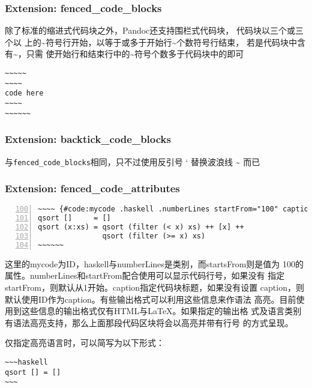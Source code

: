 \documentclass[fancyhdr,bookmark]{ctexbook}
\begin{document}
\subsubsection{Extension:
fenced\_code\_blocks}\label{extension-fencedux5fcodeux5fblocks}

除了标准的缩进式代码块之外，Pandoc还支持围栏式代码块，
代码块以三个或三个以
上的\textasciitilde{}符号行开始，以等于或多于开始行\textasciitilde{}个数符号行结束，
若是代码块中含有\textasciitilde{}，只需
使开始行和结束行中的\textasciitilde{}符号个数多于代码块中的即可

\begin{lstlisting}
~~~~~
~~~~
code here
~~~~
~~~~~~
\end{lstlisting}

\subsubsection{Extension:
backtick\_code\_blocks}\label{extension-backtickux5fcodeux5fblocks}

与\lstinline!fenced_code_blocks!相同，只不过使用反引号 ` 替换波浪线
\textasciitilde{} 而已

\subsubsection{Extension:
fenced\_code\_attributes}\label{extension-fencedux5fcodeux5fattributes}

\begin{lstlisting}[numbers=left, firstnumber=100, caption=围栏式代码块, label=code:fencedcode, float=htbp]
~~~~ {#code:mycode .haskell .numberLines startFrom="100" caption="围栏式代码块"}
qsort []     = []
qsort (x:xs) = qsort (filter (< x) xs) ++ [x] ++
               qsort (filter (>= x) xs)
~~~~~~
\end{lstlisting}

这里的mycode为ID，haskell与numberLines是类别，而startsFrom则是值为
100的属性。numberLines和startFrom配合使用可以显示代码行号，如果没有
指定startFrom，则默认从1开始。caption指定代码块标题，如果没有设置
caption，则默认使用ID作为caption。有些输出格式可以利用这些信息来作语法
高亮。目前使用到这些信息的输出格式仅有HTML与LaTeX。如果指定的输出格
式及语言类别有语法高亮支持，那么上面那段代码区块将会以高亮并带有行号
的方式呈现。

仅指定高亮语言时，可以简写为以下形式：

\begin{lstlisting}
~~~haskell
qsort [] = []
~~~
\end{lstlisting}
\end{document}
